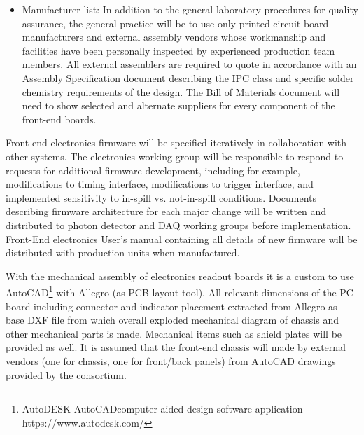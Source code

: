 \begin{itemize}
\item Manufacturer list: In addition to the general laboratory procedures for quality assurance, the general practice will be to use only printed circuit board manufacturers and external assembly vendors whose workmanship and facilities have been personally inspected by experienced production team members. All external assemblers are required to quote in accordance with an Assembly Specification document describing the IPC class and specific solder chemistry requirements of the design. The Bill of Materials document will need to show selected and alternate suppliers for every component of the front-end boards.
\end{itemize}

Front-end electronics firmware will be specified iteratively in collaboration with other systems. The electronics working group will be responsible to respond to requests for additional firmware development, including for example, modifications to timing interface, modifications to trigger interface, and implemented sensitivity to in-spill vs. not-in-spill conditions. Documents describing firmware architecture for each major change will be written and distributed to photon detector and DAQ working groups before implementation. Front-End electronics User's manual containing all details of new firmware will be distributed with production units when manufactured.

With the mechanical assembly of electronics readout boards it is a custom to use AutoCAD\footnote{AutoDESK AutoCAD\textregistered computer aided design software application https://www.autodesk.com/} with Allegro (as PCB layout tool). All relevant dimensions of the PC board including connector and indicator placement extracted from Allegro as base DXF file from which overall exploded mechanical diagram of chassis and other mechanical parts is made. Mechanical items such as shield plates will be provided as well. It is assumed that the front-end chassis will made by external vendors (one for chassis, one for front/back panels) from AutoCAD drawings provided by the consortium.

